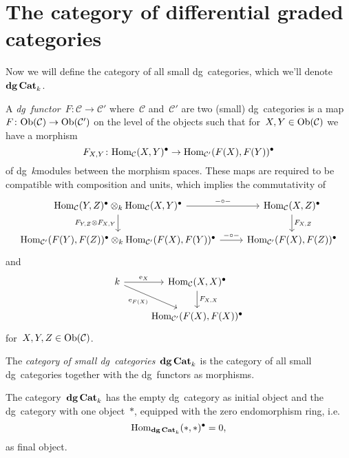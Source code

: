 \section{The category of differential graded categories}
Now we will define the category of all small dg~categories, which we'll denote~$\mathbf{dg\,Cat}_k$.
\begin{definition}
  A \emph{dg~functor}~$F\colon\mathcal{C}\to\mathcal{C}'$ where~$\mathcal{C}$ and~$\mathcal{C}'$ are two (small) dg~categories is a map~$F\colon\mathrm{Ob}(\mathcal{C})\to\mathrm{Ob}(\mathcal{C}')$ on the level of the objects such that for~$X,Y\in\mathrm{Ob}(\mathcal{C})$ we have a morphism
  \begin{equation}
    F_{X,Y}\colon\mathrm{Hom}_{\mathcal{C}}(X,Y)^\bullet\to\mathrm{Hom}_{\mathcal{C}'}(F(X),F(Y))^\bullet
  \end{equation}
  of dg~$k$\dash modules between the morphism spaces. These maps are required to be compatible with composition and units, which implies the commutativity of
  \begin{equation}
    \begin{tikzcd}
      \Hom_{\mathcal{C}}(Y,Z)^\bullet\otimes_k\Hom_{\mathcal{C}}(X,Y)^\bullet \arrow{r}{-\circ-} \arrow[swap]{d}{F_{Y,Z}\otimes F_{X,Y}} & \Hom_{\mathcal{C}}(X,Z)^\bullet \arrow{d}{F_{X,Z}} \\
      \Hom_{\mathcal{C}'}(F(Y),F(Z))^\bullet\otimes_k\Hom_{\mathcal{C}'}(F(X),F(Y))^\bullet \arrow{r}{-\circ-} & \Hom_{\mathcal{C}'}(F(X),F(Z))^\bullet
    \end{tikzcd}
  \end{equation}
  and
  \begin{equation}
    \begin{tikzcd}
      k \arrow{r}{\unit_X} \arrow{rd}[swap]{\unit_{F(X)}} & \Hom_{\mathcal{C}}(X,X)^\bullet \arrow{d}{F_{X,X}} \\
      & \Hom_{\mathcal{C}'}(F(X),F(X))^\bullet
    \end{tikzcd}
  \end{equation}
  for~$X,Y,Z\in\mathrm{Ob}(\mathcal{C})$.

  The \emph{category of small dg~categories}~$\mathbf{dg\,Cat}_k$ is the category of all small dg~categories together with the dg~functors as morphisms.
\end{definition}

\begin{remark}
  \label{remark:dgCat-initial-final}
  The category~$\mathbf{dg\,Cat}_k$ has the empty dg~category as initial object and the dg~category with one object~$*$, equipped with the zero endomorphism ring, i.e.
  \begin{equation}
    \mathrm{Hom}_{\mathbf{dg\,Cat}_k}(*,*)^\bullet=0,
  \end{equation}
  as final object.
\end{remark}

